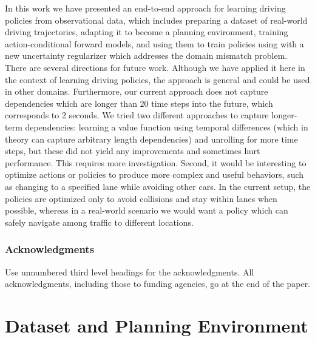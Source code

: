 \documentclass{article} %
\begin{document}
  In this work we have presented an end-to-end approach for learning driving policies from observational data, which includes preparing a dataset of real-world driving trajectories, adapting it to become a planning environment, training action-conditional forward models, and using them to train policies using with a new uncertainty regularizer which addresses the domain mismatch problem.
  There are several directions for future work.
  Although we have applied it here in the context of learning driving policies, the approach is general and could be used in other domains.
  Furthermore, our current approach does not capture dependencies which are longer than 20 time steps into the future, which corresponds to 2 seconds.
  We tried two different approaches to capture longer-term dependencies: learning a value function using temporal differences (which in theory can capture arbitrary length dependencies) and unrolling for more time steps, but these did not yield any improvements and sometimes hurt performance. This requires more investigation.
  Second, it would be interesting to optimize actions or policies to produce more complex and useful behaviors, such as changing to a specified lane while avoiding other cars.
  In the current setup, the policies are optimized only to avoid collisions and stay within lanes when possible, whereas in a real-world scenario we would want a policy which can safely navigate among traffic to different locations.



\subsubsection*{Acknowledgments}

Use unnumbered third level headings for the acknowledgments. All
acknowledgments, including those to funding agencies, go at the end of the paper.




\appendix

\section{Dataset and Planning Environment}
\label{i80-dataset-prep}
\end{document}
